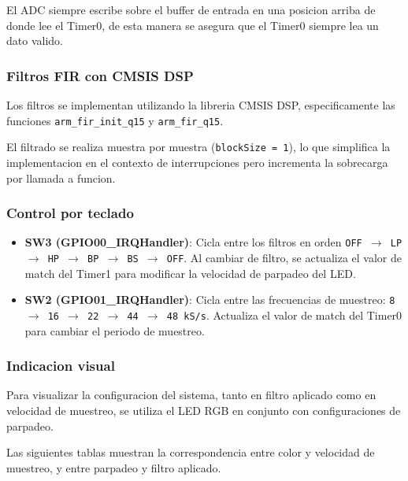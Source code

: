 \documentclass[11pt,a4paper]{article}
\begin{document}
El ADC siempre escribe sobre el buffer de entrada en una posicion arriba de
donde lee el Timer0, de esta manera se asegura que el Timer0 siempre lea un
dato valido.

\subsubsection{Filtros FIR con CMSIS DSP}

Los filtros se implementan utilizando la libreria CMSIS DSP, especificamente
las funciones \texttt{arm\_fir\_init\_q15} y \texttt{arm\_fir\_q15}.

El filtrado se realiza muestra por muestra (\texttt{blockSize = 1}), lo que
simplifica la implementacion en el contexto de interrupciones pero incrementa
la sobrecarga por llamada a funcion.

\subsubsection{Control por teclado}

\begin{itemize}
    \item \textbf{SW3 (GPIO00\_IRQHandler)}: Cicla entre los filtros en orden
          \texttt{OFF $\rightarrow$ LP $\rightarrow$ HP $\rightarrow$ BP $\rightarrow$
              BS $\rightarrow$ OFF}. Al cambiar de filtro, se actualiza el valor de
          match del Timer1 para modificar la velocidad de parpadeo del LED.
    \item \textbf{SW2 (GPIO01\_IRQHandler)}: Cicla entre las frecuencias de
          muestreo: \texttt{8 $\rightarrow$ 16 $\rightarrow$ 22 $\rightarrow$ 44
              $\rightarrow$ 48 kS/s}. Actualiza el valor de match del Timer0 para
          cambiar el periodo de muestreo.
\end{itemize}

\subsubsection{Indicacion visual}

Para visualizar la configuracion del sistema, tanto en filtro aplicado como en
velocidad de muestreo, se utiliza el LED RGB en conjunto con configuraciones de
parpadeo.

Las siguientes tablas muestran la correspondencia entre color y velocidad de
muestreo, y entre parpadeo y filtro aplicado.
\end{document}
